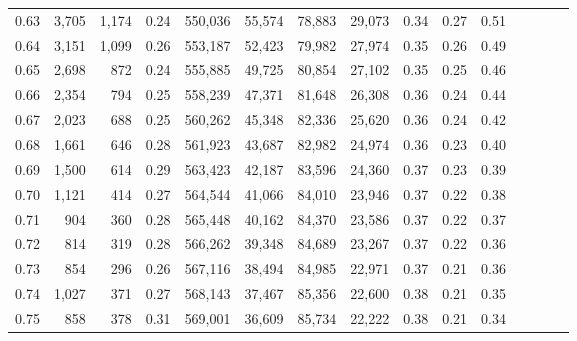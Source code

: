 \begin{tabular}{rrrcrrrrrrrrrrr}
0.63 &   3,705 &   1,174 &                                       0.24 &  550,036 &   55,574 &   78,883 &   29,073 &  0.34 &  0.27 &                         0.51 \\
0.64 &   3,151 &   1,099 &                                       0.26 &  553,187 &   52,423 &   79,982 &   27,974 &  0.35 &  0.26 &                         0.49 \\
0.65 &   2,698 &     872 &                                       0.24 &  555,885 &   49,725 &   80,854 &   27,102 &  0.35 &  0.25 &                         0.46 \\
0.66 &   2,354 &     794 &                                       0.25 &  558,239 &   47,371 &   81,648 &   26,308 &  0.36 &  0.24 &                         0.44 \\
0.67 &   2,023 &     688 &                                       0.25 &  560,262 &   45,348 &   82,336 &   25,620 &  0.36 &  0.24 &                         0.42 \\
0.68 &   1,661 &     646 &                                       0.28 &  561,923 &   43,687 &   82,982 &   24,974 &  0.36 &  0.23 &                         0.40 \\
0.69 &   1,500 &     614 &                                       0.29 &  563,423 &   42,187 &   83,596 &   24,360 &  0.37 &  0.23 &                         0.39 \\
0.70 &   1,121 &     414 &                                       0.27 &  564,544 &   41,066 &   84,010 &   23,946 &  0.37 &  0.22 &                         0.38 \\
0.71 &     904 &     360 &                                       0.28 &  565,448 &   40,162 &   84,370 &   23,586 &  0.37 &  0.22 &                         0.37 \\
0.72 &     814 &     319 &                                       0.28 &  566,262 &   39,348 &   84,689 &   23,267 &  0.37 &  0.22 &                         0.36 \\
0.73 &     854 &     296 &                                       0.26 &  567,116 &   38,494 &   84,985 &   22,971 &  0.37 &  0.21 &                         0.36 \\
0.74 &   1,027 &     371 &                                       0.27 &  568,143 &   37,467 &   85,356 &   22,600 &  0.38 &  0.21 &                         0.35 \\
0.75 &     858 &     378 &                                       0.31 &  569,001 &   36,609 &   85,734 &   22,222 &  0.38 &  0.21 &                         0.34 \\

\end{tabular}
